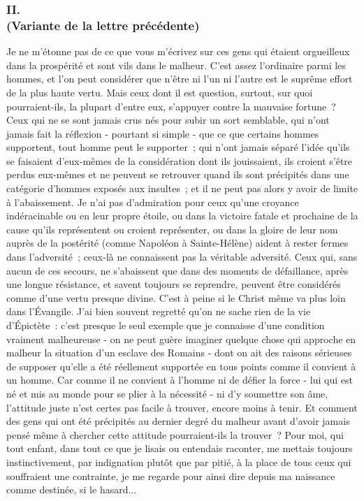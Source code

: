 \documentclass[french,twoside]{book} %
\begin{document}
\subsubsection[II. (Variante de la lettre précédente)]{II. \\
(Variante de la lettre précédente)}
\noindent Je ne m'étonne pas de ce que vous m'écrivez sur ces gens qui étaient orgueilleux dans la prospérité et sont vils dans le malheur. C'est assez l'ordi­naire parmi les hommes, et l'on peut considérer que n'être ni l'un ni l'autre est le suprême effort de la plus haute vertu. Mais ceux dont il est question, surtout, sur quoi pourraient-ils, la plupart d'entre eux, s'appuyer contre la mauvaise fortune ? Ceux qui ne se sont jamais crus nés pour subir un sort semblable, qui n'ont jamais fait la réflexion - pourtant si simple - que ce que certains hommes supportent, tout homme peut le supporter ; qui n'ont jamais séparé l'idée qu'ils se faisaient d'eux-mêmes de la considération dont ils jouissaient, ils croient s'être perdus eux-mêmes et ne peuvent se retrouver quand ils sont précipités dans une catégorie d'hommes exposés aux insultes ; et il ne peut pas alors y avoir de limite à l'abaissement. Je n'ai pas d'admiration pour ceux qu'une croyance indéracinable ou en leur propre étoile, ou dans la victoire fatale et prochaine de la cause qu'ils représentent ou croient représen­ter, ou dans la gloire de leur nom auprès de la postérité (comme Napoléon à Sainte-Hélène) aident à rester fermes dans l'adversité ; ceux-là ne connaissent pas la véritable adversité. Ceux qui, sans aucun de ces secours, ne s'abaissent que dans des moments de défaillance, après une longue résistance, et savent toujours se reprendre, peuvent être considérés comme d'une vertu presque divine. C'est à peine si le Christ même va plus loin dans l'Évangile. J'ai bien souvent regretté qu'on ne sache rien de la vie d'Épictète : c'est presque le seul exemple que je connaisse d'une condition vraiment malheureuse - on ne peut guère imaginer quelque chose qui approche en malheur la situation d'un esclave des Romains - dont on ait des raisons sérieuses de supposer qu'elle a été réellement supportée en tous points comme il convient à un homme. Car comme il ne convient à l'homme ni de défier la force - lui qui est né et mis au monde pour se plier à la nécessité - ni d'y soumettre son âme, l'attitude juste n'est certes pas facile à trouver, encore moins à tenir. Et comment des gens qui ont été précipités au dernier degré du malheur avant d'avoir jamais pensé même à chercher cette attitude pourraient-ils la trouver ? Pour moi, qui tout enfant, dans tout ce que je lisais ou entendais raconter, me mettais toujours instinctivement, par indignation plutôt que par pitié, à la place de tous ceux qui souffraient une contrainte, je me regarde pour ainsi dire depuis ma nais­sance comme destinée, si le hasard...
\end{document}
